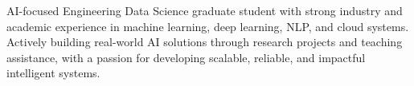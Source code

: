 \vspace{1.350em}

AI-focused Engineering Data Science graduate student with strong industry and academic experience in machine learning, deep learning, NLP, and cloud systems. Actively building real-world AI solutions through research projects and teaching assistance, with a passion for developing scalable, reliable, and impactful intelligent systems.

\vspace{-0.350em}
